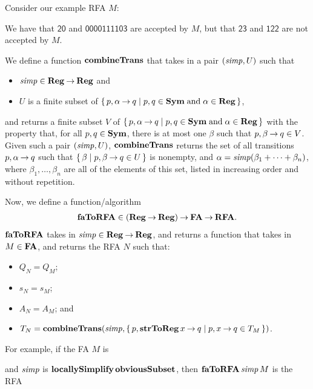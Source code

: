 Consider our example RFA $M$:
\begin{center}

\end{center}
We have that $\mathsf{20}$ and $\mathsf{0000111103}$ are
accepted by $M$, but that $\mathsf{23}$ and $\mathsf{122}$ are
not accepted by $M$.

We define a function $\mathbf{combineTrans}$ that takes in a pair $({\it simp}, U)$
such that
\begin{itemize}
\item ${\it simp}\in\mathbf{Reg}\mathbin{\to}\mathbf{Reg}$ and

\item $U$ is a finite subset of
  $\{ \, p,\alpha\mathbin{\to} q \mid p,q\in\mathbf{Sym}\;\allowbreak\mbox{and}\allowbreak\;\alpha\in\mathbf{Reg} \, \}$,
\end{itemize}
and returns a finite subset $V$ of $\{ \, p,\alpha\mathbin{\to}
  q \mid p,q\in\mathbf{Sym}\;\allowbreak\mbox{and}\allowbreak\;\alpha\in\mathbf{Reg} \, \}$ with the property that, for
all $p,q\in\mathbf{Sym}$, there is at most one $\beta$ such that $p,\beta\mathbin{\to}
q\in V$.
Given such a pair $({\it simp}, U)$, $\mathbf{combineTrans}$ returns the set of all
transitions $p,\alpha\mathbin{\to} q$ such that $\{ \, \beta \mid p,\beta\mathbin{\to} q\in U \, \}$
is nonempty, and $\alpha = {\it simp}(\beta_1+\cdots+\beta_n)$,
where $\beta_1,\ldots,\beta_n$ are all of the elements of this set,
listed in increasing order and without repetition.

Now, we define a function/algorithm
%
%
\begin{gather*}
\mathbf{faToRFA}\in(\mathbf{Reg}\mathbin{\to}\mathbf{Reg})\mathbin{\to}\mathbf{FA}\mathbin{\to}\mathbf{RFA} .  
\end{gather*}
$\mathbf{faToRFA}$ takes in ${\it simp}\in\mathbf{Reg}\mathbin{\to}\mathbf{Reg}$, and returns a
function that takes in $M\in\mathbf{FA}$, and returns the RFA
$N$ such that:
\begin{itemize}
\item $Q_N = Q_M$;

\item $s_N = s_M$;

\item $A_N = A_M$; and

\item $T_N = \mathbf{combineTrans}({\it simp},
  \{ \, p, \mathbf{strToReg}\,x\mathbin{\to} q \mid p,x\mathbin{\to} q\in T_M \, \})$.
\end{itemize}

For example, if the FA $M$ is
\begin{center}
  
\end{center}
and ${\it simp}$ is $\mathbf{locallySimplify}\,\mathbf{obviousSubset}$,
then $\mathbf{faToRFA}\,{\it simp}\,M$ is the RFA
\begin{center}
  
\end{center}

